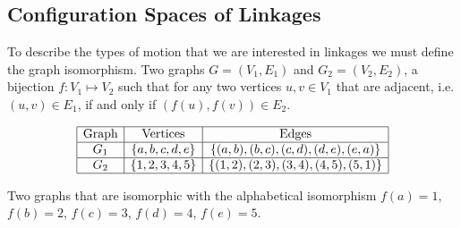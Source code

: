 \subsection{Configuration Spaces of Linkages}
To describe the types of motion that we are interested in linkages we must define the graph 
isomorphism.  Two graphs $G=(V_1,E_1)$ and $G_2 = (V_2,E_2) $, a bijection $f: V_1 \mapsto V_2$ 
such that for any two vertices $u,v \in V_1$ that are adjacent, i.e. $(u, v) \in E_1$, if and only 
if $(f(u),f(v)) \in E_2$. 
\begin{table}[!ht]
\begin{center}
$$\begin{array}{|c|c|c|}\hline
\text{Graph}&\text{Vertices}&\text{Edges}\\\hline
G_1&\left\lbrace a,b,c,d,e \right\rbrace & \left\lbrace (a,b),(b,c),(c,d),(d,e),(e,a) \right\rbrace 
\\\hline
G_2&\left\lbrace 1,2,3,4,5 \right\rbrace & \left\lbrace (1,2),(2,3),(3,4),(4,5),(5,1) \right\rbrace 
\\\hline
\end{array} $$
\caption{Two graphs that are isomorphic with the alphabetical isomorphism $f(a)=1$, $f(b)=2$, $f(c) = 3$, $f(d)=4$, $f(e)=5$.}
\end{center} 
\label{table:linkage-1}
\end{table} 
